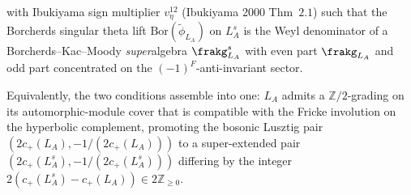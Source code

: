 \begin{theorem}
\begin{enumerate}[label=\textup{(SR\arabic*)}]
with Ibukiyama sign multiplier $v_\eta^{12}$
(Ibukiyama 2000 Thm~$2.1$) such that the Borcherds singular theta
lift $\mathrm{Bor}(\widetilde\phi_{L_A})$ on $L_A^{s}$ is the
Weyl denominator of a Borcherds--Kac--Moody \emph{super}algebra
$\frakg^{s}_{L_A}$ with even part $\frakg_{L_A}$ and odd part
concentrated on the $(-1)^F$-anti-invariant sector.
\end{enumerate}
Equivalently, the two conditions assemble into one: $L_A$ admits a
$\mathbb{Z}/2$-grading on its automorphic-module cover that is
compatible with the Fricke involution on the hyperbolic complement,
promoting the bosonic Lusztig pair
$(2c_+(L_A), -1/(2c_+(L_A)))$ to a super-extended pair
$(2c_+(L_A^{s}), -1/(2c_+(L_A^{s})))$ differing by the integer
$2(c_+(L_A^{s}) - c_+(L_A))\in 2\mathbb{Z}_{\geq 0}$.
\end{theorem}


